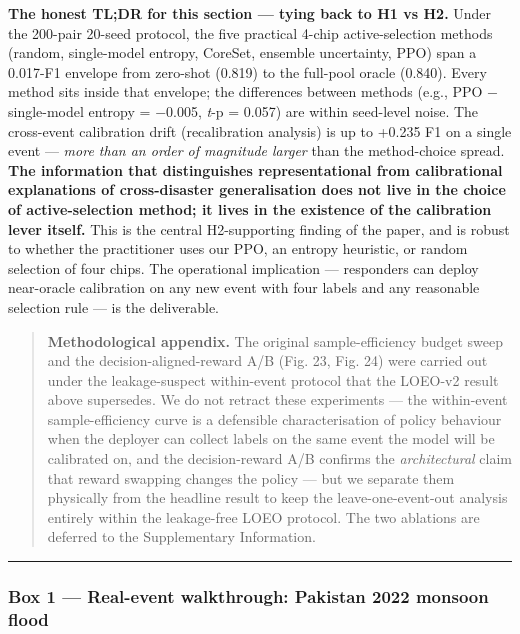 \textbf{The honest TL;DR for this section --- tying back to H1 vs H2.} Under
the 200-pair 20-seed protocol, the five practical 4-chip
active-selection methods (random, single-model entropy, CoreSet,
ensemble uncertainty, PPO) span a 0.017-F1 envelope from zero-shot
(0.819) to the full-pool oracle (0.840). Every method sits inside that
envelope; the differences between methods (e.g., PPO $-$ single-model
entropy = $-$0.005, \emph{t}-p = 0.057) are within seed-level noise. The
cross-event calibration drift (recalibration analysis) is up to +0.235 F1 on a single
event --- \emph{more than an order of magnitude larger} than the method-choice
spread. \textbf{The information that distinguishes representational from
calibrational explanations of cross-disaster generalisation does not
live in the choice of active-selection method; it lives in the
existence of the calibration lever itself.} This is the central
H2-supporting finding of the paper, and is robust to whether the
practitioner uses our PPO, an entropy heuristic, or random selection
of four chips. The operational implication --- responders can deploy
near-oracle calibration on any new event with four labels and any
reasonable selection rule --- is the deliverable.

\begin{quote}
\textbf{Methodological appendix.} The original sample-efficiency budget sweep
and the decision-aligned-reward A/B (Fig. 23, Fig. 24) were carried out
under the leakage-suspect within-event protocol that the LOEO-v2 result
above supersedes. We do not retract these experiments --- the within-event
sample-efficiency curve is a defensible characterisation of policy
behaviour when the deployer can collect labels on the same event the
model will be calibrated on, and the decision-reward A/B confirms the
\emph{architectural} claim that reward swapping changes the policy --- but we
separate them physically from the headline result to keep the leave-one-event-out analysis entirely
within the leakage-free LOEO protocol. The two ablations are deferred to
the Supplementary Information.
\end{quote}

\begin{center}\rule{0.5\linewidth}{0.5pt}\end{center}

\subsubsection{Box 1 --- Real-event walkthrough: Pakistan 2022 monsoon flood}\label{box-1-real-event-walkthrough-pakistan-2022-monsoon-flood}

